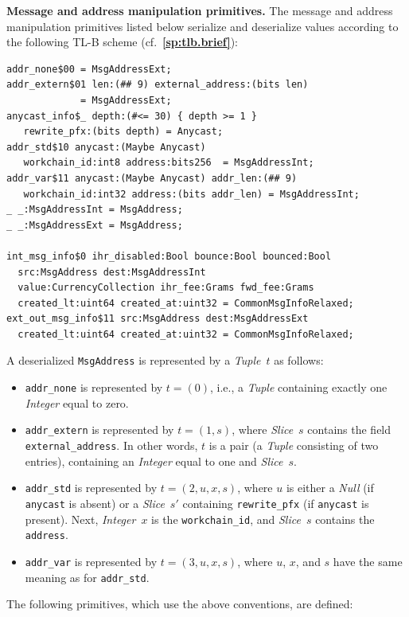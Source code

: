 \documentclass[12pt,oneside]{article}
\def\makepoint#1{\medbreak\noindent{\bf #1.\ }}
\def\nxsubpoint{\refstepcounter{subsubsection}%
  \smallbreak\makepoint{\thesubsubsection}}
\def\refpoint#1{{\rm\textbf{\ref{#1}}}}
\let\ptref=\refpoint
\def\emb#1{\textbf{#1.}}
\begin{document}
\nxsubpoint\emb{Message and address manipulation primitives}
The message and address manipulation primitives listed below serialize and deserialize values according to the following TL-B scheme (cf.~\ptref{sp:tlb.brief}):
\begin{verbatim}
addr_none$00 = MsgAddressExt;
addr_extern$01 len:(## 9) external_address:(bits len)
             = MsgAddressExt;
anycast_info$_ depth:(#<= 30) { depth >= 1 }
   rewrite_pfx:(bits depth) = Anycast;
addr_std$10 anycast:(Maybe Anycast)
   workchain_id:int8 address:bits256  = MsgAddressInt;
addr_var$11 anycast:(Maybe Anycast) addr_len:(## 9)
   workchain_id:int32 address:(bits addr_len) = MsgAddressInt;
_ _:MsgAddressInt = MsgAddress;
_ _:MsgAddressExt = MsgAddress;

int_msg_info$0 ihr_disabled:Bool bounce:Bool bounced:Bool
  src:MsgAddress dest:MsgAddressInt
  value:CurrencyCollection ihr_fee:Grams fwd_fee:Grams
  created_lt:uint64 created_at:uint32 = CommonMsgInfoRelaxed;
ext_out_msg_info$11 src:MsgAddress dest:MsgAddressExt
  created_lt:uint64 created_at:uint32 = CommonMsgInfoRelaxed;
\end{verbatim}
A deserialized {\tt MsgAddress} is represented by a {\em Tuple\/}~$t$ as follows:
\begin{itemize}
\item {\tt addr\_none} is represented by $t=(0)$, i.e., a {\em Tuple\/} containing exactly one {\em Integer\/} equal to zero.
\item {\tt addr\_extern} is represented by $t=(1,s)$, where {\em Slice\/}~$s$ contains the field {\tt external\_address}. In other words, $t$ is a pair (a {\em Tuple\/} consisting of two entries), containing an {\em Integer\/} equal to one and {\em Slice}~$s$.
\item {\tt addr\_std} is represented by $t=(2,u,x,s)$, where $u$ is either a {\em Null\/} (if {\tt anycast} is absent) or a {\em Slice\/}~$s'$ containing {\tt rewrite\_pfx} (if {\tt anycast} is present). Next, {\em Integer\/}~$x$ is the {\tt workchain\_id}, and {\em Slice\/}~$s$ contains the {\tt address}.
\item {\tt addr\_var} is represented by $t=(3,u,x,s)$, where $u$, $x$, and $s$ have the same meaning as for {\tt addr\_std}.
\end{itemize}
The following primitives, which use the above conventions, are defined:
\end{document}

